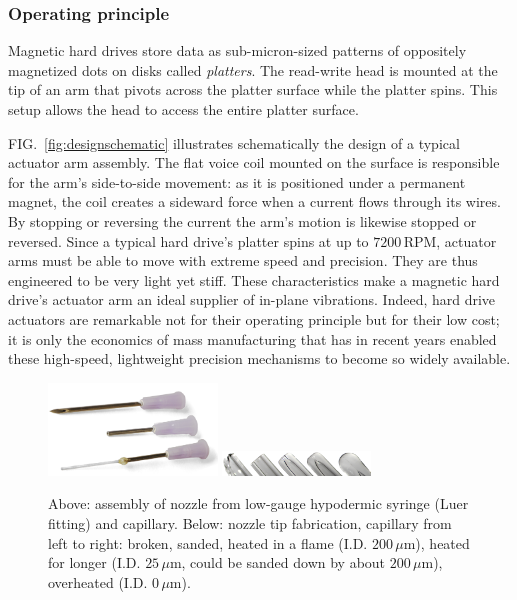 \documentclass[11.5pt]{book}
\begin{document}
\subsubsection{Operating principle}
Magnetic hard drives store data as sub-micron-sized patterns of 
oppositely magnetized dots on disks called \emph{platters}. The read-write head
is mounted at the tip of an arm that pivots across the platter surface while the
platter spins. This setup allows the head to access the entire platter surface.

FIG.~\ref{fig:designschematic} illustrates schematically the design of a typical
actuator arm assembly. The flat voice coil mounted on the surface is responsible
for the arm's side-to-side movement: as it is positioned under a permanent
magnet, the coil creates a sideward force when a current flows through its
wires. By stopping or reversing the current the arm's motion is likewise stopped
or reversed. Since a typical hard drive's platter spins at up to $7200\,$RPM,
actuator arms must be able to move with extreme speed and precision. They are
thus engineered to be very light yet stiff. These characteristics make a
magnetic hard drive's actuator arm an ideal supplier of in-plane vibrations.
Indeed, hard drive actuators are remarkable not for their operating principle
but for their low cost; it is only the economics of mass manufacturing that has
in recent years enabled these high-speed, lightweight precision mechanisms to
become so widely available.

\begin{figure}
\centering
\includegraphics[width=0.4\textwidth]{papers/hdg_images/needles.png}
\includegraphics[width=0.35\textwidth]{papers/hdg_images/needletips.png}
\caption{Above: assembly of nozzle from
low-gauge hypodermic syringe (Luer fitting) and capillary. Below: nozzle tip
fabrication, capillary from left to right: broken, sanded, heated in a flame (I.D.
$200\,\mu$m), heated for longer (I.D. $25\,\mu$m, could be sanded down by about
$200\,\mu$m), overheated (I.D. $0\,\mu$m). \label{fig:needles}}
\end{figure}
\end{document}
